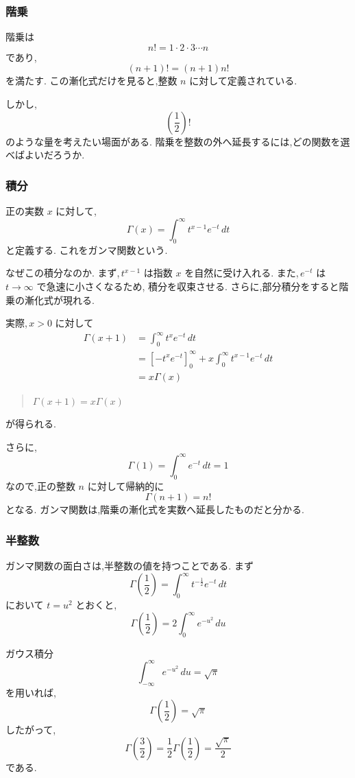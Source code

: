 \subsubsection{階乗}

階乗は
\[
  n!=1\cdot2\cdot3\cdots n
\]
であり,
\[
  (n+1)!=(n+1)n!
\]
を満たす.
この漸化式だけを見ると,整数 $n$ に対して定義されている.

しかし,
\[
  \left(\frac12\right)!
\]
のような量を考えたい場面がある.
階乗を整数の外へ延長するには,どの関数を選べばよいだろうか.

\subsubsection{積分}

正の実数 $x$ に対して,
\[
  \Gamma(x)=\int_0^\infty t^{x-1}e^{-t}\,dt
\]
と定義する.
これをガンマ関数という.

なぜこの積分なのか.
まず,\,$t^{x-1}$ は指数 $x$ を自然に受け入れる.
また,\,$e^{-t}$ は $t\to\infty$ で急速に小さくなるため,
積分を収束させる.
さらに,部分積分をすると階乗の漸化式が現れる.

実際,\,$x>0$ に対して
\[
\begin{aligned}
  \Gamma(x+1)
  &=\int_0^\infty t^x e^{-t}\,dt\\
  &=\left[-t^xe^{-t}\right]_0^\infty
    +x\int_0^\infty t^{x-1}e^{-t}\,dt\\
  &=x\Gamma(x)
\end{aligned}
\]
\begin{quote}
  $\Gamma(x+1)=x\Gamma(x)$
\end{quote}
が得られる.

さらに,
\[
  \Gamma(1)=\int_0^\infty e^{-t}\,dt=1
\]
なので,正の整数 $n$ に対して帰納的に
\[
  \Gamma(n+1)=n!
\]
となる.
ガンマ関数は,階乗の漸化式を実数へ延長したものだと分かる.

\subsubsection{半整数}

ガンマ関数の面白さは,半整数の値を持つことである.
まず
\[
  \Gamma\left(\frac12\right)
  =\int_0^\infty t^{-\frac{1}{2}}e^{-t}\,dt
\]
において $t=u^2$ とおくと,
\[
  \Gamma\left(\frac12\right)
  =2\int_0^\infty e^{-u^2}\,du
\]

ガウス積分
\[
  \int_{-\infty}^{\infty}e^{-u^2}\,du=\sqrt{\pi}
\]
を用いれば,
\[
  \Gamma\left(\frac12\right)=\sqrt{\pi}
\]
したがって,
\[
  \Gamma\left(\frac32\right)
  =\frac12\Gamma\left(\frac12\right)
  =\frac{\sqrt{\pi}}2
\]
である.

